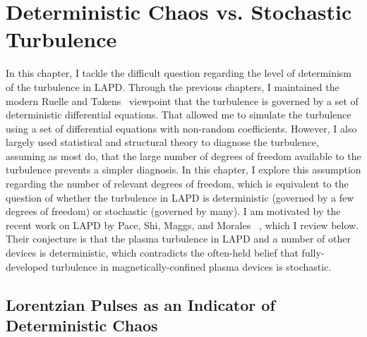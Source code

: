 \chapter{Deterministic Chaos vs. Stochastic Turbulence}
\label{c_chaos}

In this chapter, I tackle the difficult question regarding the level of determinism of the turbulence in LAPD. Through the previous chapters, I maintained the modern 
Ruelle and Takens~\cite{ruelle1971} viewpoint that the turbulence is governed by a set of deterministic differential equations. That allowed me to simulate the turbulence using a set of differential
equations with non-random coefficients. However, I also largely used statistical and structural theory to diagnose the turbulence, assuming as most do, that the large number of degrees of freedom
available to the turbulence prevents a simpler diagnosis.
In this chapter, I explore this assumption regarding the number of relevant degrees of freedom, which is equivalent to the question of whether the turbulence in LAPD is deterministic
(governed by a few degrees of freedom) or stochastic (governed by many).
I am motivated by the recent work on LAPD by Pace, Shi, Maggs, and Morales
~\cite{pace2008a,pace2008b,shi2009,maggs2011,maggs2012a,maggs2012b,maggs2013}, which I review below. Their conjecture is that the plasma turbulence in LAPD and a number of other devices is deterministic,
which contradicts the often-held belief that fully-developed turbulence in magnetically-confined plasma devices is stochastic.

\section{Lorentzian Pulses as an Indicator of Deterministic Chaos}
\label{s_lorentzian_pulses}

